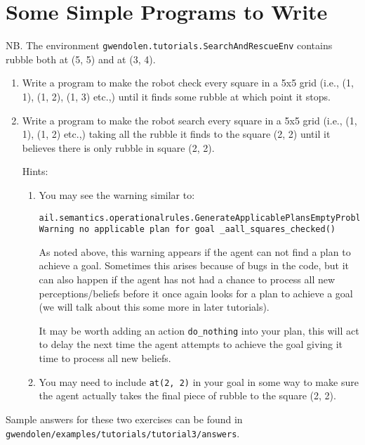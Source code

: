 \documentclass[a4]{article}
\begin{document}
\section{Some Simple Programs to Write}
NB.  The environment \texttt{gwendolen.tutorials.SearchAndRescueEnv} contains rubble both at (5, 5) and at (3, 4).
\begin{enumerate}
\item Write a program to make the robot check every square in a 5x5 grid (i.e., (1, 1), (1, 2), (1, 3) etc.,) until it finds some rubble at which point it stops.
\item Write a program to make the robot search every square in a 5x5 grid (i.e., (1, 1), (1, 2) etc.,) taking all the rubble it finds to the square (2, 2) until it believes there is only rubble in square (2, 2).

Hints:
\begin{enumerate}
\item You may see the warning similar to:
\begin{small}
\begin{verbatim}
ail.semantics.operationalrules.GenerateApplicablePlansEmptyProblemGoal[WARNING|main|2:09:29]: 
Warning no applicable plan for goal _aall_squares_checked() 
\end{verbatim}
\end{small}
As noted above, this warning appears if the agent can not find a plan to achieve a goal.  Sometimes this arises because of bugs in the code, but it can also happen if the agent has not had a chance to process all new perceptions/beliefs before it once again looks for a plan to achieve a goal (we will talk about this some more in later tutorials).  

It may be worth adding an action \lstinline{do_nothing} into your plan, this will act to delay the next time the agent attempts to achieve the goal giving it time to process all new beliefs.
\item You may need to include \lstinline{at(2, 2)} in your goal in some way to make sure the agent actually takes the final piece of rubble to the square (2, 2).
\end{enumerate}
\end{enumerate}
\begin{sloppypar}
Sample answers for these two exercises can be found in \texttt{gwendolen/examples/tutorials/tutorial3/answers}.
\end{sloppypar}
\end{document}
